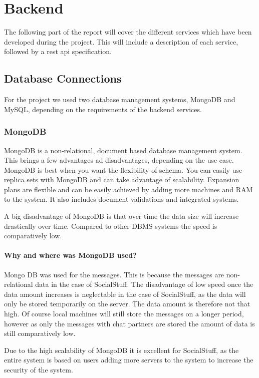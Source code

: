 \section{Backend}\label{sec:backend}

The following part of the report will cover the different services which have been developed during the project.
This will include a description of each service, followed by a \ac{rest} \ac{api} specification.

\subsection{Database Connections}\label{subsec:database-connections}

For the project we used two database management systems, MongoDB and MySQL, depending on the requirements of the backend
services.

\subsubsection{MongoDB}
MongoDB is a non-relational, document based database management system.
This brings a few advantages ad disadvantages, depending on the use case.
MongoDB is best when you want the flexibility of schema.
You can easily use replica sets with MongoDB and can take advantage of scalability.
Expansion plans are flexible and can be easily achieved by adding more machines and RAM to the system.
It also includes document validations and integrated systems.

A big disadvantage of MongoDB is that over time the data size will increase drastically over time.
Compared to other DBMS systems the speed is comparatively low.

\paragraph{Why and where was MongoDB used?}
Mongo DB was used for the messages.
This is because the messages are non-relational data in the case of SocialStuff.
The disadvantage of low speed once the data amount increases is neglectable in the case of SocialStuff, as the data will
only be stored temporarily on the server.
The data amount is therefore not that high.
Of course local machines will still store the messages on a longer period, however as only the messages with chat
partners are stored the amount of data is still comparatively low.

Due to the high scalability of MongoDB it is excellent for SocialStuff, as the entire system is based on users adding
more servers to the system to increase the security of the system.

